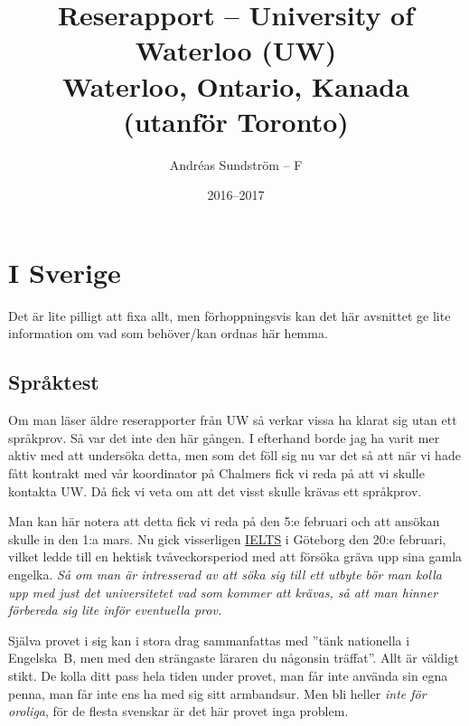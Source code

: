\documentclass[11pt,a4paper, english, swedish]{article}
\begin{document}
\title{Reserapport -- University of Waterloo (UW) 
\\ \Large Waterloo, Ontario, Kanada \large(utanför Toronto)}
\author{Andréas Sundström -- F}
\date{2016--2017}

\maketitle

\addtocounter{section}{-1}
\section{I Sverige}
Det är lite pilligt att fixa allt, men förhoppningsvis kan det här
avsnittet ge lite information om vad som behöver/kan ordnas här hemma.

\subsection{Språktest}
Om man läser äldre reserapporter från UW så verkar vissa ha klarat sig
utan ett språkprov. Så var det inte den här gången. I efterhand borde
jag ha varit mer aktiv med att undersöka detta, men som det föll sig
nu var det så att när vi hade fått kontrakt med vår koordinator på
Chalmers fick vi reda på att vi skulle kontakta UW\footnotemark{}.
Då fick vi veta om att det visst skulle krävas ett språkprov. 

Man kan här notera att detta fick vi reda på den 5:e februari och att
ansökan skulle in den 1:a mars. Nu gick visserligen
\href{http://www.folkuniversitetet.se/Las-mer-om-sprak/Sprakexamina/IELTS/IELTS-Goteborg/}{IELTS}
i Göteborg den 20:e februari, vilket ledde till en hektisk
tvåveckorsperiod med att försöka gräva upp sina gamla
engelka. \emph{Så om man är intresserad av att söka sig till ett
  utbyte bör man kolla upp med just det universitetet vad som kommer
  att krävas, så att man hinner förbereda sig lite inför eventuella
  prov.}

Själva provet i sig kan i stora drag sammanfattas med ''tänk
nationella i Engelska~B, men med den strängaste läraren du någonsin
träffat''. Allt är väldigt stikt. De kolla ditt pass hela tiden
under provet, man får inte använda sin egna penna, man får inte ens ha
med sig sitt armbandsur. Men bli heller \emph{inte för oroliga}, för
de flesta svenskar är det här provet inga problem. 
\end{document}
